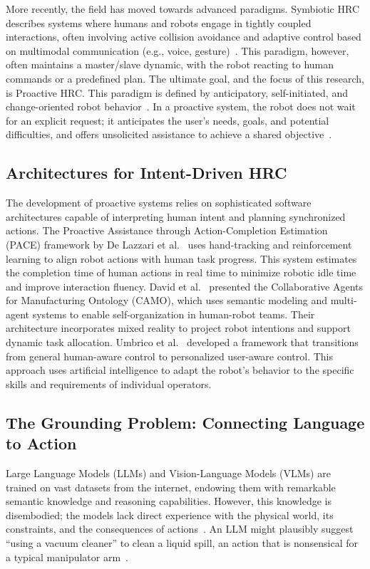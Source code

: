 \documentclass[sensors,article,submit,pdftex,moreauthors]{Definitions/mdpi}
\begin{document}
More recently, the field has moved towards advanced paradigms. Symbiotic HRC describes systems where humans and robots engage in tightly coupled interactions, often involving active collision avoidance and adaptive control based on multimodal communication (e.g., voice, gesture)~\cite{Andronas2021, Asad2023}. This paradigm, however, often maintains a master/slave dynamic, with the robot reacting to human commands or a predefined plan. The ultimate goal, and the focus of this research, is Proactive HRC. This paradigm is defined by anticipatory, self-initiated, and change-oriented robot behavior~\cite{Sirintuna2024}. In a proactive system, the robot does not wait for an explicit request; it anticipates the user's needs, goals, and potential difficulties, and offers unsolicited assistance to achieve a shared objective~\cite{Andronas2021, Nezhad2020}.

\subsection{Architectures for Intent-Driven HRC}

The development of proactive systems relies on sophisticated software architectures capable of interpreting human intent and planning synchronized actions. The Proactive Assistance through Action-Completion Estimation (PACE) framework by De Lazzari et al.~\cite{PACE} uses hand-tracking and reinforcement learning to align robot actions with human task progress. This system estimates the completion time of human actions in real time to minimize robotic idle time and improve interaction fluency. David et al.~\cite{David2023} presented the Collaborative Agents for Manufacturing Ontology (CAMO), which uses semantic modeling and multi-agent systems to enable self-organization in human-robot teams. Their architecture incorporates mixed reality to project robot intentions and support dynamic task allocation. Umbrico et al.~\cite{Umbrico2022} developed a framework that transitions from general human-aware control to personalized user-aware control. This approach uses artificial intelligence to adapt the robot's behavior to the specific skills and requirements of individual operators. %

\subsection{The Grounding Problem: Connecting Language to Action}

Large Language Models (LLMs) and Vision-Language Models (VLMs) are trained on vast datasets from the internet, endowing them with remarkable semantic knowledge and reasoning capabilities. However, this knowledge is disembodied; the models lack direct experience with the physical world, its constraints, and the consequences of actions~\cite{Chi2023}. An LLM might plausibly suggest ``using a vacuum cleaner'' to clean a liquid spill, an action that is nonsensical for a typical manipulator arm~\cite{Ahn2022}.
\end{document}
